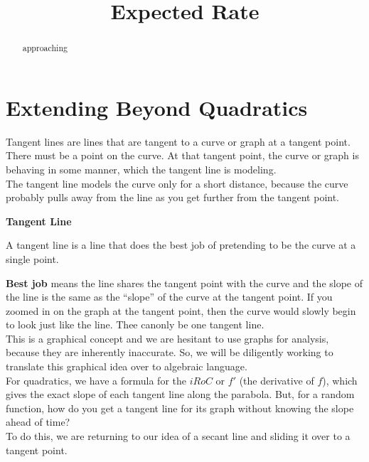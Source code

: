 \documentclass{ximera}
\title{Expected Rate}
\begin{document}
\begin{abstract}
approaching
\end{abstract}
\maketitle
 
 



\section*{Extending Beyond Quadratics} 


Tangent lines are lines that are tangent to a curve or graph at a tangent point. There must be a point on the curve. At that tangent point, the curve or graph is behaving in some manner, which the tangent line is modeling.  \\

The tangent line models the curve only for a short distance, because the curve probably pulls away from the line as you get further from the tangent point.\\

\begin{idea} \textbf{\textcolor{blue!55!black}{Tangent Line}}


A tangent line is a line that does the best job of pretending to be the curve at a single point.
\end{idea}


\textbf{Best job} means the line shares the tangent point with the curve and the slope of the line is the same as the ``slope'' of the curve at the tangent point. If you zoomed in on the graph at the tangent point, then the curve would slowly begin to look just like the line. Thee canonly be one tangent line.\\

This is a graphical concept and we are hesitant to use graphs for analysis, because they are inherently inaccurate. So, we will be diligently working to translate this graphical idea over to algebraic language. \\


For quadratics, we have a formula for the $iRoC$ or $f'$ (the derivative of $f$), which gives the exact slope of each tangent line along the parabola.  But, for a random function, how do you get a tangent line for its graph without knowing the slope ahead of time? \\


To do this, we are returning to our idea of a secant line and sliding it over to a tangent point. \\
\end{document}
